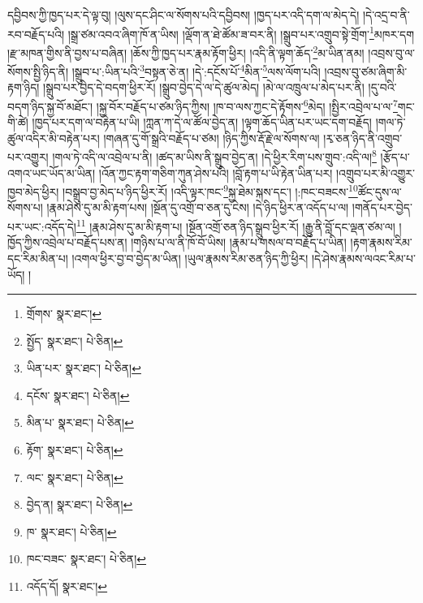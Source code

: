 དབྱིབས་ཀྱི་ཁྱད་པར་དེ་ལྟ་བུ། །ལུས་དང་ཤིང་ལ་སོགས་པའི་དབྱིབས། །ཁྱད་པར་འདི་དག་ལ་མེད་དེ། །དེ་འདྲ་བ་ནི་རབ་བརྗོད་པའི། །སྒྲ་ཙམ་འབའ་ཞིག་ཁོ་ན་ཡིས། །ལྡོག་ན་ཐེ་ཚོམ་ཟ་བར་ནི། །སྒྲུབ་པར་འགྲུབ་སྟེ་གྲོག་\footnote{གྲོགས་  སྣར་ཐང་། }མཁར་དག །རྫ་མཁན་གྱིས་ནི་བྱས་པ་བཞིན། །ཆོས་ཀྱི་ཁྱད་པར་རྣམ་རྟོག་ཕྱིར། །འདི་ནི་ལྟག་ཆོད་\footnote{སྤྱོད་  སྣར་ཐང་།  པེ་ཅིན། }མ་ཡིན་ནམ། །འབྲས་བུ་ལ་སོགས་སྤྱི་ཉིད་ནི། །སྒྲུབ་པ་:ཡིན་པའི་\footnote{ཡིན་པར་  སྣར་ཐང་།  པེ་ཅིན། }བསྟན་ཅེ་ན། །དེ་:དངོས་པོ་\footnote{དངོས་  སྣར་ཐང་།  པེ་ཅིན། }མིན་\footnote{མིན་པ་  སྣར་ཐང་།  པེ་ཅིན། }ལས་ལོག་པའི། །འབྲས་བུ་ཙམ་ཞིག་མི་རྟག་ཉིད། །སྒྲུབ་པར་བྱེད་དེ་བདག་ཕྱིར་རོ། །སྒྲུབ་བྱེད་དེ་ལ་དེ་ཚུལ་མེད། །མེ་ལ་འཁྲུལ་པ་མེད་པར་ནི། །དུ་བའི་བདག་ཉིད་སྐྱ་བོ་མཐོང་། །སྐྱ་བོར་བརྗོད་པ་ཙམ་ཉིད་ཀྱིས། །ཁ་བ་ལས་ཀྱང་དེ་རྟོགས་\footnote{རྟོག་  སྣར་ཐང་།  པེ་ཅིན། }མེད། །སྤྱིར་འབྲེལ་པ་ལ་\footnote{ལང་  སྣར་ཐང་།  པེ་ཅིན། }གང་གི་ཚེ། །ཁྱད་པར་དག་ལ་བརྟེན་པ་ཡི། །ཀླན་ཀ་དེ་ལ་ཚོལ་བྱེད་ན། །ལྟག་ཆོད་ཡིན་པར་ཡང་དག་བརྗོད། །གལ་ཏེ་ཚུལ་འདིར་མི་བརྟེན་པར། །གཞན་དུ་གོ་སྒྲའི་བརྗོད་པ་ཙམ། །ཉིད་ཀྱིས་རྡོ་རྗེ་ལ་སོགས་ལ། །རྭ་ཅན་ཉིད་ནི་འགྲུབ་པར་འགྱུར། །གལ་ཏེ་འདི་ལ་འབྲེལ་པ་ནི། །ཚད་མ་ཡིས་ནི་སྒྲུབ་བྱེད་ན། །དེ་ཕྱིར་རིག་པས་གྲུབ་:འདི་ལ།\footnote{བྱེད་ན།  སྣར་ཐང་།  པེ་ཅིན། } །རྩོད་པ་འགའ་ཡང་ཡོད་མ་ཡིན། །འོན་ཀྱང་རྟག་གཅིག་ཀུན་ཤེས་པའི། །བློ་རྟག་པ་ཡི་རྟེན་ཡིན་པར། །འགྲུབ་པར་མི་འགྱུར་ཁྱབ་མེད་ཕྱིར། །བསྒྲུབ་བྱ་མེད་པ་ཉིད་ཕྱིར་རོ། །འདི་ལྟར་ཁང་\footnote{ཁ་  སྣར་ཐང་།  པེ་ཅིན། }སྐྱ་ཐེམ་སྐས་དང་། །:ཁང་བཟངས་\footnote{ཁང་བཟང་  སྣར་ཐང་།  པེ་ཅིན། }ཚོང་དུས་ལ་སོགས་པ། །རྣམ་ཤེས་དུ་མ་མི་རྟག་པས། །སྔོན་དུ་འགྲོ་བ་ཅན་དུ་ངེས། །དེ་ཉིད་ཕྱིར་ན་འདོད་པ་ལ། །གནོད་པར་བྱེད་པར་ཡང་:འདོད་དེ།\footnote{འདོད་དོ།  སྣར་ཐང་། } །རྣམ་ཤེས་དུ་མ་མི་རྟག་པ། །སྔོན་འགྲོ་ཅན་ཉིད་སྒྲུབ་ཕྱིར་རོ། །རྒྱུ་ནི་བློ་དང་ལྡན་ཙམ་ལ། །ཁྱོད་ཀྱིས་འབྲེལ་པ་བརྗོད་པས་ན། །གཉིས་པ་ལ་ནི་ཁོ་བོ་ཡིས། །རྣམ་པ་གསལ་བ་བརྗོད་པ་ཡིན། །རྟག་རྣམས་རིམ་དང་རིམ་མིན་པ། །འགལ་ཕྱིར་བྱ་བ་བྱེད་མ་ཡིན། །ཡུལ་རྣམས་རིམ་ཅན་ཉིད་ཀྱི་ཕྱིར། །དེ་ཤེས་རྣམས་ལའང་རིམ་པ་ཡོད། །
